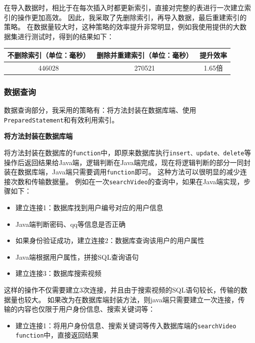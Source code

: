 \documentclass[a4paper,10pt]{ctexart}
\begin{document}
在导入数据时，相比于在每次插入时都更新索引，直接对完整的表进行一次建立索引的操作更加高效。
因此，我采取了先删除索引，再导入数据，最后重建索引的策略。
在数据量较大时，这种策略的效率提升非常明显，例如我使用提供的大数据集进行测试时，得到的结果如下：
\begin{center}
    \begin{tabular}{ccc}
        \toprule
        \textbf{不删除索引（单位：毫秒）} & \textbf{删除并重建索引（单位：毫秒）} & \textbf{提升效率} \\
        \midrule
        446028 & 270521 & 1.65倍 \\
        \bottomrule
    \end{tabular}
\end{center}

\subsubsection{数据查询}

数据查询部分，我采用的策略有：将方法封装在数据库端、使用\texttt{PreparedStatement}和有效利用索引。

\textbf{将方法封装在数据库端}

将方法封装在数据库的\texttt{function}中，即原来数据库执行\texttt{insert、update、delete}等操作后返回结果给Java端，逻辑判断在Java端完成，现在将逻辑判断的部分一同封装在数据库端，Java端只需要调用\texttt{function}即可。
这种方法可以很明显的减少连接次数和传输数据量。
例如在一次\texttt{searchVideo}的查询中，如果在Java端实现，步骤如下：
\begin{itemize}
    \item 建立连接1：数据库找到用户编号对应的用户信息
    \item Java端判断密码、qq等信息是否正确
    \item 如果身份验证成功，建立连接2：数据库查询该用户的用户属性
    \item Java端根据用户属性，拼接SQL查询语句
    \item 建立连接3：数据库搜索视频
\end{itemize}

这样的操作不仅需要建立3次连接，并且由于搜索视频的SQL语句较长，传输的数据量也较大。
如果改为在数据库端封装方法，则java端只需要建立一次连接，传输的内容也仅限于用户身份信息、搜索关键词等：
\begin{itemize}
    \item 建立连接1：将用户身份信息、搜索关键词等传入数据库端的\texttt{searchVideo function}中，直接返回结果
\end{itemize}
\end{document}
